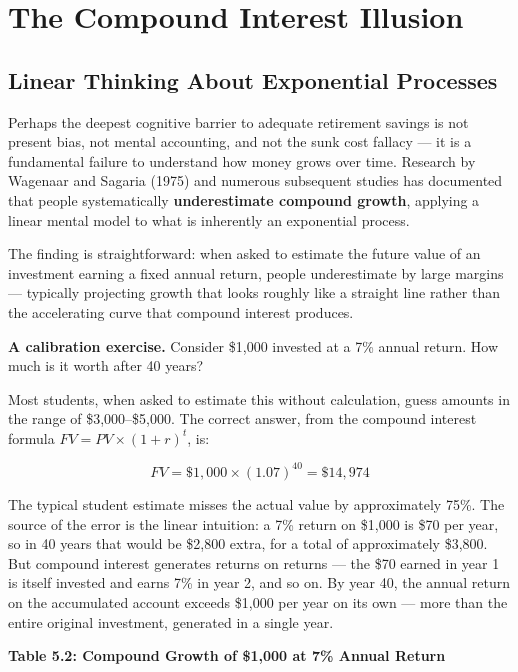 \documentclass[12pt, letterpaper]{article}
\begin{document}
\medskip


\section{The Compound Interest Illusion}



\subsection{Linear Thinking About Exponential Processes}


Perhaps the deepest cognitive barrier to adequate retirement savings is not present bias, not mental accounting, and not the sunk cost fallacy --- it is a fundamental failure to understand how money grows over time. Research by Wagenaar and Sagaria (1975) and numerous subsequent studies has documented that people systematically \textbf{underestimate compound growth}, applying a linear mental model to what is inherently an exponential process.

The finding is straightforward: when asked to estimate the future value of an investment earning a fixed annual return, people underestimate by large margins --- typically projecting growth that looks roughly like a straight line rather than the accelerating curve that compound interest produces.

\textbf{A calibration exercise.} Consider \$1,000 invested at a 7\% annual return. How much is it worth after 40 years?

Most students, when asked to estimate this without calculation, guess amounts in the range of \$3,000--\$5,000. The correct answer, from the compound interest formula $FV = PV \times (1+r)^t$, is:

$$FV = \$1,000 \times (1.07)^{40} = \$14,974$$

The typical student estimate misses the actual value by approximately 75\%. The source of the error is the linear intuition: a 7\% return on \$1,000 is \$70 per year, so in 40 years that would be \$2,800 extra, for a total of approximately \$3,800. But compound interest generates returns on returns --- the \$70 earned in year 1 is itself invested and earns 7\% in year 2, and so on. By year 40, the annual return on the accumulated account exceeds \$1,000 per year on its own --- more than the entire original investment, generated in a single year.

\textbf{Table 5.2: Compound Growth of \$1,000 at 7\% Annual Return}
\end{document}
